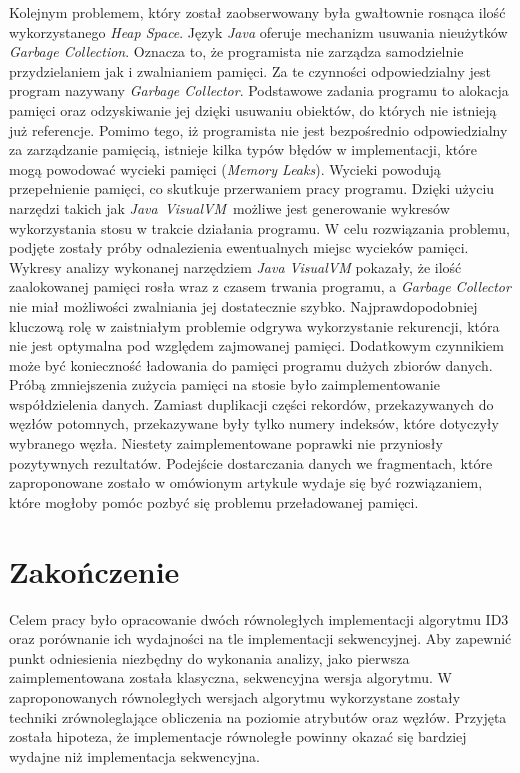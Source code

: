 \documentclass[12pt]{article}
\begin{document}
Kolejnym problemem, który został zaobserwowany była gwałtownie rosnąca ilość wykorzystanego \textit{Heap Space}.
Język \textit{Java} oferuje mechanizm usuwania nieużytków \textit{Garbage Collection}. Oznacza to, że programista nie zarządza
samodzielnie przydzielaniem jak i zwalnianiem pamięci. Za te czynności odpowiedzialny jest program nazywany \textit{Garbage Collector}.
Podstawowe zadania programu to alokacja pamięci oraz odzyskiwanie jej dzięki usuwaniu obiektów, do których nie istnieją już referencje.
Pomimo tego, iż programista nie jest bezpośrednio odpowiedzialny za zarządzanie pamięcią, istnieje kilka typów błędów w
implementacji, które mogą powodować wycieki pamięci (\textit{Memory Leaks}). Wycieki powodują przepełnienie pamięci,
co skutkuje przerwaniem pracy programu.
Dzięki użyciu narzędzi takich jak \textit{Java~VisualVM}~możliwe jest generowanie wykresów wykorzystania stosu
w trakcie działania programu.
W celu rozwiązania problemu, podjęte zostały próby odnalezienia ewentualnych miejsc wycieków pamięci.
Wykresy analizy wykonanej narzędziem \textit{Java VisualVM} pokazały, że ilość zaalokowanej pamięci rosła wraz
z czasem trwania programu, a \textit{Garbage Collector} nie miał możliwości zwalniania jej dostatecznie szybko. 
Najprawdopodobniej kluczową rolę w zaistniałym problemie odgrywa wykorzystanie rekurencji, która nie jest optymalna pod względem
zajmowanej pamięci. Dodatkowym czynnikiem może być konieczność ładowania do pamięci programu dużych zbiorów danych.
Próbą zmniejszenia zużycia pamięci na stosie było zaimplementowanie współdzielenia danych. Zamiast duplikacji części rekordów,
przekazywanych do węzłów potomnych, przekazywane były tylko numery indeksów, które dotyczyły wybranego węzła.
Niestety zaimplementowane poprawki nie przyniosły pozytywnych rezultatów.
Podejście dostarczania danych we fragmentach, które zaproponowane zostało w omówionym artykule \cite{parallel-algorithm-to-induce-decision-trees}
wydaje się być rozwiązaniem, które mogłoby pomóc pozbyć się problemu przeładowanej pamięci.

\newpage

\cleardoublepage
{}
{}
\section*{Zakończenie}

Celem pracy było opracowanie dwóch równoległych implementacji algorytmu ID3 oraz
porównanie ich wydajności na tle implementacji sekwencyjnej. Aby zapewnić punkt odniesienia niezbędny do
wykonania analizy, jako pierwsza zaimplementowana została klasyczna, sekwencyjna wersja algorytmu.
W zaproponowanych równoległych wersjach algorytmu wykorzystane zostały techniki zrównoleglające
obliczenia na poziomie atrybutów oraz węzłów. 
Przyjęta została hipoteza, że implementacje równoległe powinny okazać się bardziej wydajne
niż implementacja sekwencyjna.
\end{document}
